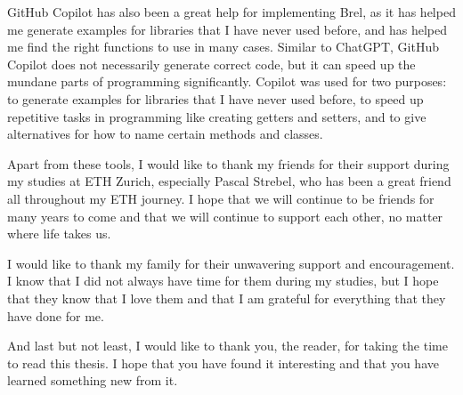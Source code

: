 GitHub Copilot has also been a great help for implementing Brel, 
as it has helped me generate examples for libraries that I have never used before,
and has helped me find the right functions to use in many cases.
Similar to ChatGPT, GitHub Copilot does not necessarily generate correct code, 
but it can speed up the mundane parts of programming significantly.
Copilot was used for two purposes: to generate examples for libraries that I have never used before, 
to speed up repetitive tasks in programming like creating getters and setters, 
and to give alternatives for how to name certain methods and classes.

Apart from these tools, I would like to thank my friends for their support during my studies at ETH Zurich, 
especially Pascal Strebel, who has been a great friend all throughout my ETH journey.
I hope that we will continue to be friends for many years to come and that we will continue to support each other, no matter where life takes us.

I would like to thank my family for their unwavering support and encouragement.
I know that I did not always have time for them during my studies, 
but I hope that they know that I love them and that I am grateful for everything that they have done for me.

And last but not least, I would like to thank you, the reader, for taking the time to read this thesis.
I hope that you have found it interesting and that you have learned something new from it.
